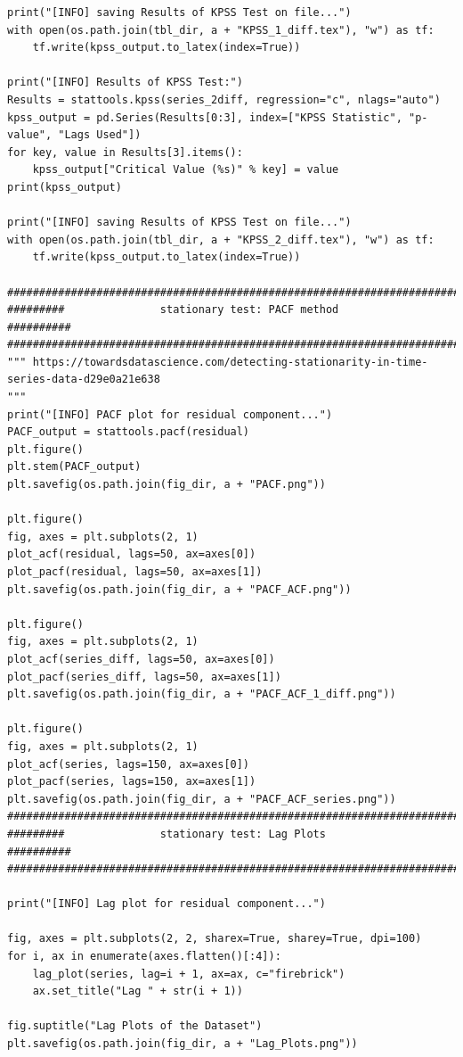 \documentclass[12pt]{article}
\begin{document}
\begin{lstlisting}
print("[INFO] saving Results of KPSS Test on file...")
with open(os.path.join(tbl_dir, a + "KPSS_1_diff.tex"), "w") as tf:
    tf.write(kpss_output.to_latex(index=True))

print("[INFO] Results of KPSS Test:")
Results = stattools.kpss(series_2diff, regression="c", nlags="auto")
kpss_output = pd.Series(Results[0:3], index=["KPSS Statistic", "p-value", "Lags Used"])
for key, value in Results[3].items():
    kpss_output["Critical Value (%s)" % key] = value
print(kpss_output)

print("[INFO] saving Results of KPSS Test on file...")
with open(os.path.join(tbl_dir, a + "KPSS_2_diff.tex"), "w") as tf:
    tf.write(kpss_output.to_latex(index=True))

############################################################################
#########               stationary test: PACF method              ##########
############################################################################
""" https://towardsdatascience.com/detecting-stationarity-in-time-series-data-d29e0a21e638
"""
print("[INFO] PACF plot for residual component...")
PACF_output = stattools.pacf(residual)
plt.figure()
plt.stem(PACF_output)
plt.savefig(os.path.join(fig_dir, a + "PACF.png"))

plt.figure()
fig, axes = plt.subplots(2, 1)
plot_acf(residual, lags=50, ax=axes[0])
plot_pacf(residual, lags=50, ax=axes[1])
plt.savefig(os.path.join(fig_dir, a + "PACF_ACF.png"))

plt.figure()
fig, axes = plt.subplots(2, 1)
plot_acf(series_diff, lags=50, ax=axes[0])
plot_pacf(series_diff, lags=50, ax=axes[1])
plt.savefig(os.path.join(fig_dir, a + "PACF_ACF_1_diff.png"))

plt.figure()
fig, axes = plt.subplots(2, 1)
plot_acf(series, lags=150, ax=axes[0])
plot_pacf(series, lags=150, ax=axes[1])
plt.savefig(os.path.join(fig_dir, a + "PACF_ACF_series.png"))
############################################################################
#########               stationary test: Lag Plots                ##########
############################################################################

print("[INFO] Lag plot for residual component...")

fig, axes = plt.subplots(2, 2, sharex=True, sharey=True, dpi=100)
for i, ax in enumerate(axes.flatten()[:4]):
    lag_plot(series, lag=i + 1, ax=ax, c="firebrick")
    ax.set_title("Lag " + str(i + 1))

fig.suptitle("Lag Plots of the Dataset")
plt.savefig(os.path.join(fig_dir, a + "Lag_Plots.png"))



\end{lstlisting}
\end{document}
